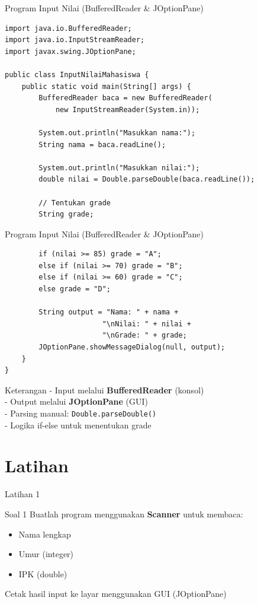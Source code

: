 \documentclass{beamer}
\begin{document}
\begin{frame}[fragile]{Program Input Nilai (BufferedReader \& JOptionPane)}
\begin{lstlisting}
import java.io.BufferedReader;
import java.io.InputStreamReader;
import javax.swing.JOptionPane;

public class InputNilaiMahasiswa {
    public static void main(String[] args) {
        BufferedReader baca = new BufferedReader(
            new InputStreamReader(System.in));
        
        System.out.println("Masukkan nama:");
        String nama = baca.readLine();
        
        System.out.println("Masukkan nilai:");
        double nilai = Double.parseDouble(baca.readLine());
        
        // Tentukan grade
        String grade;
\end{lstlisting}
\end{frame}

\begin{frame}[fragile]{Program Input Nilai (BufferedReader \& JOptionPane)}
\begin{lstlisting}
        if (nilai >= 85) grade = "A";
        else if (nilai >= 70) grade = "B";
        else if (nilai >= 60) grade = "C";
        else grade = "D";
        
        String output = "Nama: " + nama + 
                       "\nNilai: " + nilai + 
                       "\nGrade: " + grade;
        JOptionPane.showMessageDialog(null, output);
    }
}
\end{lstlisting}

\begin{block}{Keterangan}
- Input melalui \textbf{BufferedReader} (konsol)\\
- Output melalui \textbf{JOptionPane} (GUI)\\
- Parsing manual: \texttt{Double.parseDouble()}\\
- Logika if-else untuk menentukan grade
\end{block}
\end{frame}

\section{Latihan}
\begin{frame}{Latihan 1}
  \begin{block}{Soal 1}
    Buatlah program menggunakan \textbf{Scanner} untuk membaca:
    \begin{itemize}
      \item Nama lengkap
      \item Umur (integer)
      \item IPK (double)
    \end{itemize}
    Cetak hasil input ke layar menggunakan GUI (JOptionPane)
  \end{block}
\end{frame}
\end{document}
